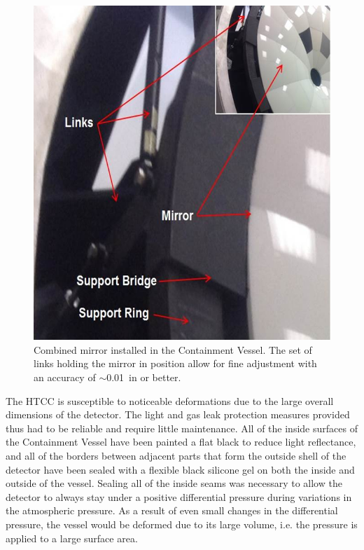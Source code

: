 \begin{figure}[ht]
    \centering
    \includegraphics[width=1.0\linewidth,trim={0 0cm 0 0},clip]{images/HTCC_MIRR_INST_NEW.jpg}
    \caption{Combined mirror installed in the Containment Vessel. The set of links holding the mirror in position
      allow for fine adjustment with an accuracy of $\sim$0.01~in or better.}
    \label{fig:HTCC_MIRR_INST_NEW}
\end{figure}

The HTCC is susceptible to noticeable deformations due to the large overall dimensions of the detector. The
light and gas leak protection measures provided thus had to be reliable and require little maintenance. All of
the inside surfaces of the Containment Vessel have been painted a flat black to reduce light reflectance, and
all of the borders between adjacent parts that form the outside shell of the detector have been sealed with
a flexible black silicone gel on both the inside and outside of the vessel. Sealing all of the inside seams was
necessary to allow the detector to always stay under a positive differential pressure during variations in the
atmospheric pressure. As a result of even small changes in the differential pressure, the vessel would be
deformed due to its large volume, i.e. the pressure is applied to a large surface area. 

